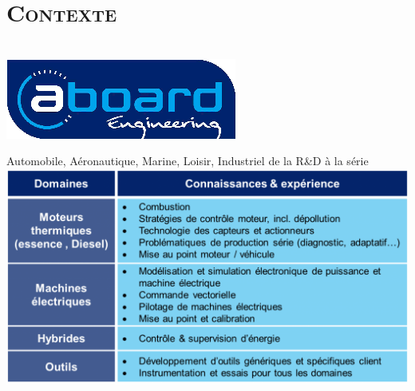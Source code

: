 \documentclass[xcolor=x11names,compress]{beamer}
\begin{document}
\section{\scshape Contexte}
\begin{frame}{\vspace{-17pt}\\\includegraphics[scale=0.25]{images/aboard}}
  \begin{center}
	{\footnotesize Automobile, Aéronautique, Marine, Loisir, Industriel de la
	R\&D à la série}\\
	\vspace{10pt}
	\includegraphics[scale=0.3]{images/domaines}\\
  \end{center}
\end{frame}

\end{document}
